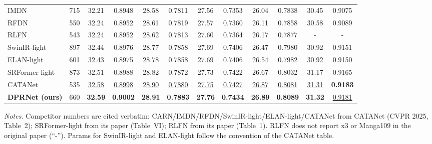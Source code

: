 \begin{table}[H]
\begin{tabular*}{\textwidth}{@{\extracolsep{\fill}}lccccccccccc}
IMDN            & 715  & 32.21 & 0.8948 & 28.58 & 0.7811 & 27.56 & 0.7353 & 26.04 & 0.7838 & 30.45 & 0.9075 \\
RFDN            & 550  & 32.24 & 0.8952 & 28.61 & 0.7819 & 27.57 & 0.7360 & 26.11 & 0.7858 & 30.58 & 0.9089 \\
RLFN            & 543  & 32.24 & 0.8952 & 28.62 & 0.7813 & 27.60 & 0.7364 & 26.17 & 0.7877 & -     & -      \\
SwinIR-light    & 897  & 32.44 & 0.8976 & 28.77 & 0.7858 & 27.69 & 0.7406 & 26.47 & 0.7980 & 30.92 & 0.9151 \\
ELAN-light      & 601  & 32.43 & 0.8975 & 28.78 & 0.7858 & 27.69 & 0.7406 & 26.54 & 0.7982 & 30.92 & 0.9150 \\
SRFormer-light  & 873  & 32.51 & 0.8988 & 28.82 & 0.7872 & 27.73 & 0.7422 & 26.67 & 0.8032 & 31.17 & 0.9165 \\
CATANet         & 535  & \underline{32.58} & \underline{0.8998} & \underline{28.90} & \underline{0.7880} & \underline{27.75} & \underline{0.7427} & \underline{26.87} & \underline{0.8081} & \underline{31.31} & \textbf{0.9183} \\
\textbf{DPRNet (ours)} & 660 & \textbf{32.59} & \textbf{0.9002} & \textbf{28.91} & \textbf{0.7883} & \textbf{27.76} & \textbf{0.7434} & \textbf{26.89} & \textbf{0.8089} & \textbf{31.32} & \underline{0.9181} \\
\bottomrule
\end{tabular*}
\endgroup

\vspace{2pt}
{\footnotesize
\textit{Notes.} Competitor numbers are cited verbatim: CARN/IMDN/RFDN/SwinIR-light/ELAN-light/CATANet from CATANet
(CVPR 2025, Table~2); SRFormer-light from its paper (Table~VI); RLFN from its paper (Table~1).
RLFN does not report x3 or Manga109 in the original paper (``-''). Params for SwinIR-light and
ELAN-light follow the convention of the CATANet table.}
\end{table}
